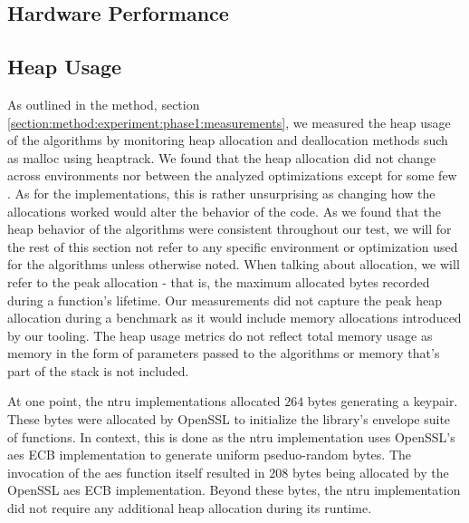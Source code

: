 
\subsection{Hardware Performance}



\subsection{Heap Usage}

As outlined in the method, section \ref{section:method:experiment:phase1:measurements}, we measured the heap usage of the algorithms by monitoring heap allocation and deallocation methods such as malloc using heaptrack. We found that the heap allocation did not change across environments nor between the analyzed optimizations except for some few . As for the implementations, this is rather unsurprising as changing how the allocations worked would alter the behavior of the code. As we found that the heap behavior of the algorithms were consistent throughout our test, we will for the rest of this section not refer to any specific environment or optimization used for the algorithms unless otherwise noted. When talking about allocation, we will refer to the peak allocation - that is, the maximum allocated bytes recorded during a function's lifetime. Our measurements did not capture the peak heap allocation during a benchmark as it would include memory allocations introduced by our tooling. The heap usage metrics do not reflect total memory usage as memory in the form of parameters passed to the algorithms or memory that's part of the stack is not included.

At one point, the \gls{ntru} implementations allocated $264$ bytes generating a keypair. These bytes were allocated by OpenSSL to initialize the library's envelope suite of functions. In context, this is done as the \gls{ntru} implementation uses OpenSSL's \gls{aes} ECB implementation to generate uniform pseduo-random bytes. The invocation of the \gls{aes} function itself resulted in $208$ bytes being allocated by the OpenSSL \gls{aes} ECB implementation. Beyond these bytes, the \gls{ntru} implementation did not require any additional heap allocation during its runtime.

